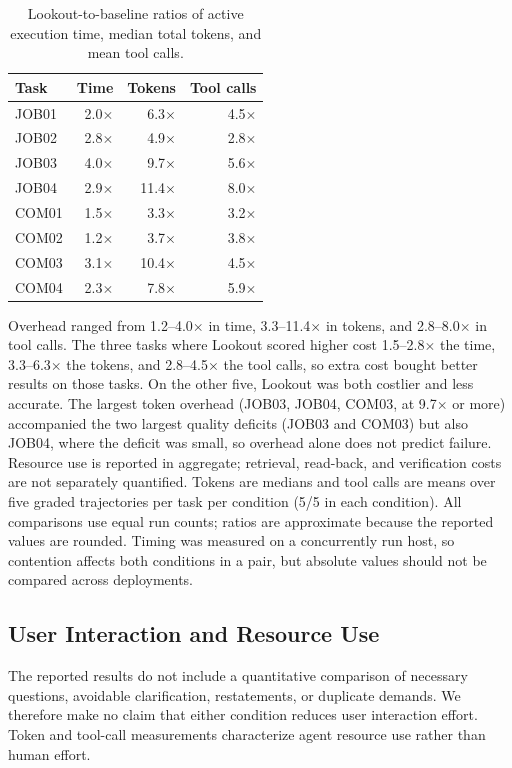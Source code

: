 \documentclass[twocolumn]{article}
\begin{document}
\begin{table}[t]
\centering\small
\begin{tabular}{@{}lrrr@{}}
\toprule
Task & Time & Tokens & Tool calls \\
\midrule
JOB01 & 2.0$\times$ & 6.3$\times$ & 4.5$\times$ \\
JOB02 & 2.8$\times$ & 4.9$\times$ & 2.8$\times$ \\
JOB03 & 4.0$\times$ & 9.7$\times$ & 5.6$\times$ \\
JOB04 & 2.9$\times$ & 11.4$\times$ & 8.0$\times$ \\
COM01 & 1.5$\times$ & 3.3$\times$ & 3.2$\times$ \\
COM02 & 1.2$\times$ & 3.7$\times$ & 3.8$\times$ \\
COM03 & 3.1$\times$ & 10.4$\times$ & 4.5$\times$ \\
COM04 & 2.3$\times$ & 7.8$\times$ & 5.9$\times$ \\
\bottomrule
\end{tabular}
\caption{Lookout-to-baseline ratios of active execution time, median total tokens, and mean tool calls.}
\label{tab:overhead}
\end{table}

Overhead ranged from 1.2--4.0$\times$ in time, 3.3--11.4$\times$ in tokens, and 2.8--8.0$\times$ in tool calls. The three tasks where Lookout scored higher cost 1.5--2.8$\times$ the time, 3.3--6.3$\times$ the tokens, and 2.8--4.5$\times$ the tool calls, so extra cost bought better results on those tasks. On the other five, Lookout was both costlier and less accurate. The largest token overhead (JOB03, JOB04, COM03, at 9.7$\times$ or more) accompanied the two largest quality deficits (JOB03 and COM03) but also JOB04, where the deficit was small, so overhead alone does not predict failure. Resource use is reported in aggregate; retrieval, read-back, and verification costs are not separately quantified. Tokens are medians and tool calls are means over five graded trajectories per task per condition (5/5 in each condition). All comparisons use equal run counts; ratios are approximate because the reported values are rounded. Timing was measured on a concurrently run host, so contention affects both conditions in a pair, but absolute values should not be compared across deployments.



\subsection{User Interaction and Resource Use}
The reported results do not include a quantitative comparison of necessary questions, avoidable clarification, restatements, or duplicate demands. We therefore make no claim that either condition reduces user interaction effort. Token and tool-call measurements characterize agent resource use rather than human effort.
\end{document}
